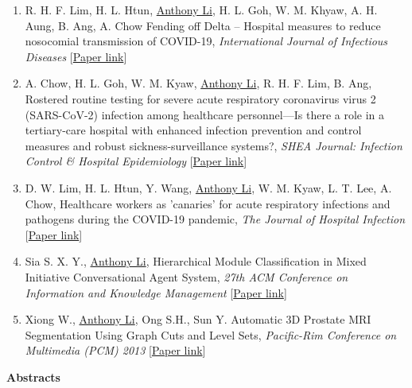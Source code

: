 \documentclass[letterpaper,10pt,oneside]{article}
\begin{document}
\begin{body}
\begin{enumerate}
\item R. H. F. Lim, H. L. Htun, \underline{Anthony Li}, H. L. Goh, W. M. Khyaw, A. H. Aung, B. Ang, A. Chow \textcolor{mygray}{Fending off Delta – Hospital measures to reduce nosocomial transmission of COVID-19}, \textit{International Journal of Infectious Diseases }[\href{https://www.ijidonline.com/article/S1201-9712(22)00077-7/fulltext}{Paper link}]


\item A. Chow, H. L. Goh, W. M. Kyaw, \underline{Anthony Li}, R. H. F. Lim, B. Ang, \textcolor{mygray}{Rostered routine testing for severe acute respiratory coronavirus virus 2 (SARS-CoV-2) infection among healthcare personnel—Is there a role in a tertiary-care hospital with enhanced infection prevention and control measures and robust sickness-surveillance systems?}, \textit{SHEA Journal: Infection Control \& Hospital Epidemiology} [\href{https://www.cambridge.org/core/journals/infection-control-and-hospital-epidemiology/article/rostered-routine-testing-for-severe-acute-respiratory-coronavirus-virus-2-sarscov2-infection-among-healthcare-personnelis-there-a-role-in-a-tertiarycare-hospital-with-enhanced-infection-prevention-and-control-measures-and-robust-sicknesssurveillance-systems/30E175AEA1FBA0080DBB281D436D477B}{Paper link}]

\item D. W. Lim, H. L. Htun, Y. Wang, \underline{Anthony Li}, W. M. Kyaw, L. T. Lee, A. Chow, \textcolor{mygray}{Healthcare workers as 'canaries' for acute respiratory infections and pathogens during the COVID-19 pandemic}, \textit{The Journal of Hospital Infection} [\href{https://www.journalofhospitalinfection.com/article/S0195-6701(21)00140-7/fulltext}{Paper link}]

\item Sia S. X. Y., \underline{Anthony Li}, \textcolor{mygray}{Hierarchical Module Classification in Mixed Initiative Conversational Agent System}, \textit{27th ACM Conference on Information and Knowledge Management}
[\href{https://dl.acm.org/citation.cfm?id=3133185}{Paper link}]

\item Xiong W., \underline{Anthony Li}, Ong S.H., Sun Y. \textcolor{mygray}{Automatic 3D Prostate MRI Segmentation Using Graph Cuts and Level Sets}, \textit{Pacific-Rim Conference on Multimedia (PCM) 2013}
[\href{https://link.springer.com/chapter/10.1007/978-3-319-03731-8_20}{Paper link}]
\end{enumerate}

\textbf{Abstracts}
\GapNoBreak
{}


\end{body}
\end{document}
